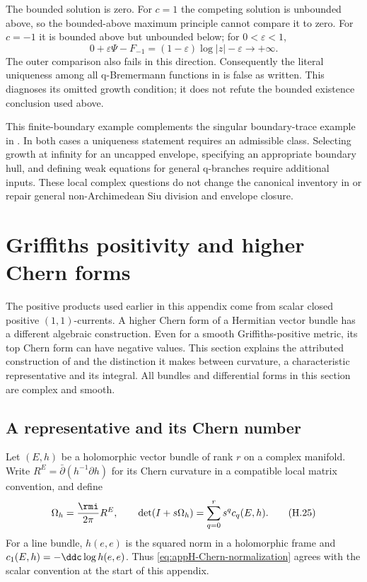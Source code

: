 The bounded solution is zero. For \(c=1\) the competing solution is
unbounded above, so the bounded-above maximum principle cannot compare
it to zero. For \(c=-1\) it is bounded above but unbounded below;
for \(0<\varepsilon<1\),
\[
  0+\varepsilon\Psi-F_{-1}
     =(1-\varepsilon)\log|z|-\varepsilon\longrightarrow+\infty.
\]
The outer comparison also fails in this direction. Consequently the
literal uniqueness among all q-Bremermann functions in
\cite[Theorem~4.19(5), Claim~5; actual pp.~10, 12]{Pawlaschyk26UnboundedPerronV1}
is false as written. This diagnoses its omitted growth condition; it
does not refute the bounded existence conclusion used above.

This finite-boundary example complements the singular boundary-trace
example in . In both cases a
uniqueness statement requires an admissible class. Selecting growth at
infinity for an uncapped envelope, specifying an appropriate boundary hull,
and defining weak equations for general q-branches require additional
inputs. These local complex questions do not change the canonical
inventory in  or repair general
non-Archimedean Siu division and envelope closure.


\section{Griffiths positivity and higher Chern forms}
\label{sec:appH-Griffiths-Chern}

The positive products used earlier in this appendix come from scalar
closed positive $(1,1)$-currents. A higher Chern form of a Hermitian
vector bundle has a different algebraic construction. Even for a
smooth Griffiths-positive metric, its top Chern form can have negative
values. This section explains the attributed construction of
\cite[Theorem~1.1]{Du26GriffithsTopChernV1} and the distinction it makes
between curvature, a characteristic representative and its integral.
All bundles and differential forms in this section are complex and
smooth.

\subsection{A representative and its Chern number}
\label{sec:appH-Chern-representative}

Let $(E,h)$ be a holomorphic vector bundle of rank $r$ on a complex
manifold. Write $R^E=\bar\partial(h^{-1}\partial h)$ for its Chern
curvature in a compatible local matrix convention, and define
\begin{equation*}
 \Omega_h=\frac{\rmi}{2\pi}R^E,\qquad
 \det(I+s\Omega_h)=\sum_{q=0}^r s^q c_q(E,h).
 \tag{H.25}\label{eq:appH-Chern-normalization}
\end{equation*}
For a line bundle, $h(e,e)$ is the squared norm in a holomorphic
frame and $c_1(E,h)=-\ddc\log h(e,e)$. Thus
\eqref{eq:appH-Chern-normalization} agrees with the scalar convention
at the start of this appendix.

